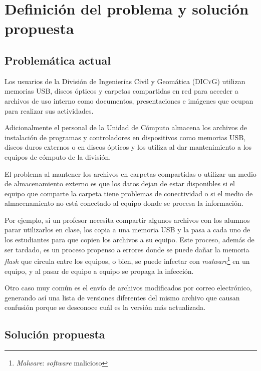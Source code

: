 {
  \linespread{1}
  \cleardoublepage  
  \chapter{Definici\'{o}n del problema y soluci\'{o}n propuesta}
  \label{chap:cap2}
}

    \section {Problem\'{a}tica actual}

Los usuarios de la Divisi\'{o}n de Ingenier\'{i}as Civil y Geom\'{a}tica (\textsc{DICyG}) utilizan memorias \textsc{USB}, discos \'{o}pticos y carpetas compartidas en red para acceder a archivos de uso interno como documentos, presentaciones e im\'{a}genes que ocupan para realizar sus actividades.

Adicionalmente el personal de la Unidad de C\'{o}mputo almacena los archivos de instalaci\'{o}n de programas y controladores en dispositivos como memorias \textsc{USB}, discos duros externos o en discos \'{o}pticos y los utiliza al dar mantenimiento a los equipos de c\'{o}mputo de la divisi\'{o}n.

El problema al mantener los archivos en carpetas compartidas o utilizar un medio de almacenamiento externo es que los datos dejan de estar disponibles si el equipo que comparte la carpeta tiene problemas de conectividad o si el medio de almacenamiento no est\'{a} conectado al equipo donde se procesa la informaci\'{o}n.

Por ejemplo, si un profesor necesita compartir algunos archivos con los alumnos parar utilizarlos en clase, los copia a una memoria \textsc{USB} y la pasa a cada uno de los estudiantes para que copien los archivos a su equipo. Este proceso, adem\'{a}s de ser tardado, es un proceso propenso a errores donde se puede da\~{n}ar la memoria \textit{flash} que circula entre los equipos, o bien, se puede infectar con \textit{malware}\footnote{\textit{Malware}: \emph{\gls{software}} malicioso} en un equipo, y al pasar de equipo a equipo se propaga la infecci\'{o}n.

Otro caso muy com\'{u}n es el env\'{i}o de archivos modificados por correo electr\'{o}nico, generando as\'{i} una lista de versiones diferentes del mismo archivo que causan confusi\'{o}n porque se desconoce cu\'{a}l es la versi\'{o}n m\'{a}s actualizada.

    \section {Soluci\'{o}n propuesta}


